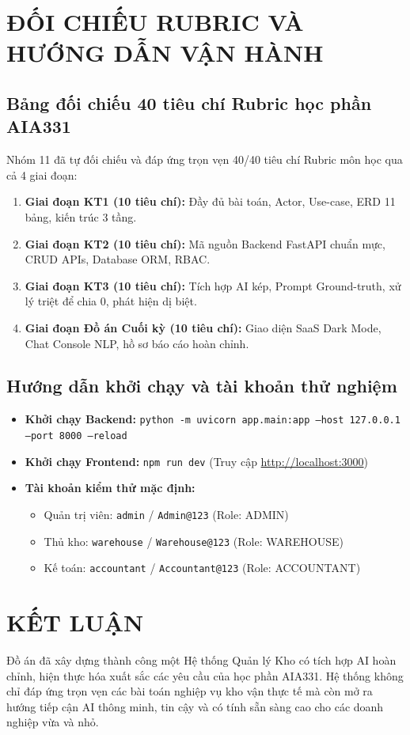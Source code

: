 \chapter{ĐỐI CHIẾU RUBRIC VÀ HƯỚNG DẪN VẬN HÀNH}

\section{Bảng đối chiếu 40 tiêu chí Rubric học phần AIA331}
Nhóm 11 đã tự đối chiếu và đáp ứng trọn vẹn 40/40 tiêu chí Rubric môn học qua cả 4 giai đoạn:
\begin{enumerate}
    \item \textbf{Giai đoạn KT1 (10 tiêu chí):} Đầy đủ bài toán, Actor, Use-case, ERD 11 bảng, kiến trúc 3 tầng.
    \item \textbf{Giai đoạn KT2 (10 tiêu chí):} Mã nguồn Backend FastAPI chuẩn mực, CRUD APIs, Database ORM, RBAC.
    \item \textbf{Giai đoạn KT3 (10 tiêu chí):} Tích hợp AI kép, Prompt Ground-truth, xử lý triệt để chia 0, phát hiện dị biệt.
    \item \textbf{Giai đoạn Đồ án Cuối kỳ (10 tiêu chí):} Giao diện SaaS Dark Mode, Chat Console NLP, hồ sơ báo cáo hoàn chỉnh.
\end{enumerate}

\section{Hướng dẫn khởi chạy và tài khoản thử nghiệm}
\begin{itemize}
    \item \textbf{Khởi chạy Backend:} \texttt{python -m uvicorn app.main:app --host 127.0.0.1 --port 8000 --reload}
    \item \textbf{Khởi chạy Frontend:} \texttt{npm run dev} (Truy cập \url{http://localhost:3000})
    \item \textbf{Tài khoản kiểm thử mặc định:}
    \begin{itemize}
        \item Quản trị viên: \texttt{admin} / \texttt{Admin@123} (Role: ADMIN)
        \item Thủ kho: \texttt{warehouse} / \texttt{Warehouse@123} (Role: WAREHOUSE)
        \item Kế toán: \texttt{accountant} / \texttt{Accountant@123} (Role: ACCOUNTANT)
    \end{itemize}
\end{itemize}

\chapter*{KẾT LUẬN}
Đồ án đã xây dựng thành công một Hệ thống Quản lý Kho có tích hợp AI hoàn chỉnh, hiện thực hóa xuất sắc các yêu cầu của học phần AIA331. Hệ thống không chỉ đáp ứng trọn vẹn các bài toán nghiệp vụ kho vận thực tế mà còn mở ra hướng tiếp cận AI thông minh, tin cậy và có tính sẵn sàng cao cho các doanh nghiệp vừa và nhỏ.
